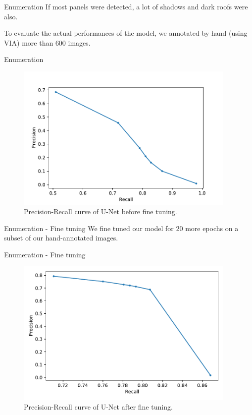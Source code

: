 \documentclass[12pt]{beamer}
\begin{document}
\begin{frame}{Enumeration}
    If \alert{most panels} were detected, a lot of \alert{shadows} and \alert{dark roofs} were also.
    
    To evaluate the actual performances of the model, we \alert{annotated by hand} (using \alert{VIA}) more than \alert{600} images.
\end{frame}

\begin{frame}{Enumeration}
    \begin{figure}
        \centering
        \vspace{-0.5em}
        \includegraphics[width=0.95\textwidth]{resources/pdf/precision_recall_before.pdf}
        \caption{Precision-Recall curve of U-Net before fine tuning.}
    \end{figure}
\end{frame}

\begin{frame}{Enumeration - Fine tuning}
    We \alert{fine tuned} our model for \alert{20} more epochs on a subset of our hand-annotated images.
\end{frame}

\begin{frame}{Enumeration - Fine tuning}
    \begin{figure}
        \centering
        \includegraphics[width=0.95\textwidth]{resources/pdf/precision_recall_after.pdf}
        \caption{Precision-Recall curve of U-Net after fine tuning.}
    \end{figure}
\end{frame}
\end{document}
